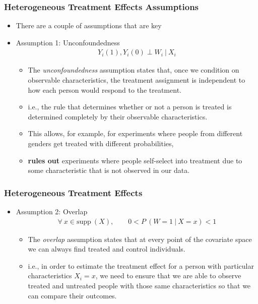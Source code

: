 \documentclass[
  shownotes,
  xcolor={svgnames},
  hyperref={colorlinks,citecolor=DarkBlue,linkcolor=DarkRed,urlcolor=DarkBlue}
  , aspectratio=169]{beamer}
\begin{document}
\begin{frame}[fragile]
\frametitle{Heterogeneous Treatment Effects Assumptions}

\begin{itemize}
  \item There are  a couple of assumptions that are key


  \item Assumption 1: Unconfoundedness
  \begin{align}
  Y_i(1), Y_i(0) \perp W_i \ | \ X_i
  \end{align}
  \begin{itemize}
  \item The \emph{unconfoundedness} assumption states that, once we condition on observable characteristics, the treatment assignment is independent to
  how each person would respond to the treatment. 
  \item i.e.,  the rule that determines whether or not a person is treated is determined completely by their observable characteristics. 
  \item This allows, for example, for experiments where people from different genders get treated with different probabilities, 
  \item {\bf rules out} experiments where people self-select into treatment due to some characteristic that is not observed in our data.

\end{itemize}


\end{itemize}




\end{frame}
\begin{frame}[fragile]
\frametitle{Heterogeneous Treatment Effects}

\begin{itemize}
  \item Assumption 2: Overlap
  \medskip
  \begin{align}
  \forall \ x \in \text{supp}\ (X), \qquad 0 < P\ (W = 1 \ | \ X = x)  < 1
  \end{align}

    \begin{itemize}
    \item The \emph{overlap} assumption states that at every point of the covariate space we can always find treated and control individuals.
    \medskip
    \item  i.e., in order to estimate the treatment effect for a person with particular  characteristics \(X_{i} = x\), we need to ensure that we are able to
    observe treated and untreated people with those same characteristics so that we can compare their outcomes. 
    \end{itemize}
\end{itemize}

\end{frame}
\end{document}
